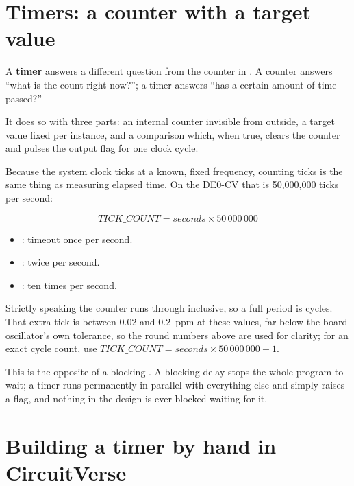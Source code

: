 
\section{Timers: a counter with a target value}
\label{c7:sec:concept}

A \textbf{timer} answers a different question from the counter in . A counter
answers ``what is the count right now?''; a timer answers ``has a certain amount of time passed?''

It does so with three parts: an internal counter invisible from outside, a target value
 fixed per instance, and a comparison which, when true, clears the counter and
pulses the output flag  for one clock cycle.

Because the system clock ticks at a known, fixed frequency, counting ticks is the same thing as
measuring elapsed time. On the DE0-CV that is 50,000,000 ticks per second:

\[ \mathit{TICK\_COUNT} = \mathit{seconds} \times 50\,000\,000 \]

\begin{itemize}
  \item {}: timeout once per second.
  \item {}: twice per second.
  \item {}: ten times per second.
\end{itemize}

Strictly speaking the counter runs  through  inclusive, so a full period is
 cycles. That extra tick is between 0.02 and 0.2~ppm at these values, far below
the board oscillator's own tolerance, so the round numbers above are used for clarity; for an exact
cycle count, use $\mathit{TICK\_COUNT} = \mathit{seconds} \times 50\,000\,000 - 1$.

This is the opposite of a blocking . A blocking delay stops the whole program to
wait; a timer runs permanently in parallel with everything else and simply raises a flag, and
nothing in the design is ever blocked waiting for it.

\section{Building a timer by hand in CircuitVerse}
\label{c7:sec:byhand}

